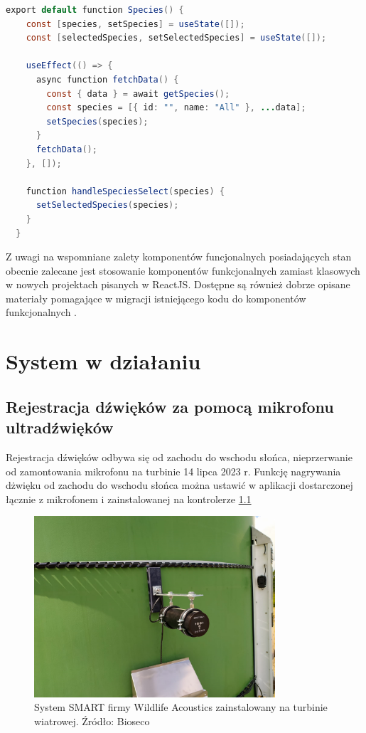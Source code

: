 \documentclass{sprz}
\begin{document}
\begin{lstlisting}[language=Java,caption={Przykład komponentu funcjonalnego}, label={lst:functional_component}]
  export default function Species() {
    const [species, setSpecies] = useState([]);
    const [selectedSpecies, setSelectedSpecies] = useState([]);
  
    useEffect(() => {
      async function fetchData() {
        const { data } = await getSpecies();
        const species = [{ id: "", name: "All" }, ...data];
        setSpecies(species);
      }
      fetchData();
    }, []);
  
    function handleSpeciesSelect(species) {
      setSelectedSpecies(species);
    }
  }
\end{lstlisting}

Z uwagi na wspomniane zalety komponentów funcjonalnych posiadających stan obecnie zalecane jest stosowanie komponentów funkcjonalnych zamiast klasowych w nowych projektach pisanych w ReactJS. Dostępne są również dobrze opisane materiały pomagające w migracji istniejącego kodu do komponentów funkcjonalnych \cite{react-component}.

\chapter{System w działaniu}

\section{Rejestracja dźwięków za pomocą mikrofonu ultradźwięków}
Rejestracja dźwięków odbywa się od zachodu do wschodu słońca, nieprzerwanie od zamontowania mikrofonu na turbinie 14 lipca 2023 r. Funkcję nagrywania dżwięku od zachodu do wschodu słońca można ustawić w aplikacji dostarczonej łącznie z mikrofonem i zainstalowanej na kontrolerze \ref{img:smart-installed}

\begin{figure}[h]
  \centering
  \includegraphics[width=0.8\textwidth]{sprz/smart-installed.png}
  \caption{System SMART firmy Wildlife Acoustics zainstalowany na turbinie wiatrowej. Źródło: Bioseco}
  \label{img:smart-installed}
\end{figure} 
\end{document}
